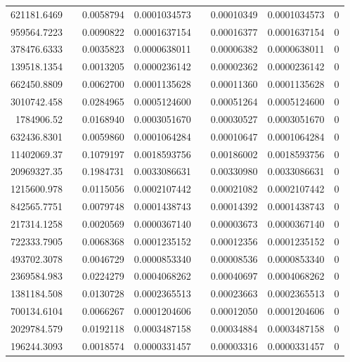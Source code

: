 \documentclass[
journal=jacsat, %
manuscript=article]{achemso}
\begin{document}
\begin{table}[htbp]
{\begin{tabular}{rrrrrrrr}
    621181.6469 &       & 0.0058794 & 0.0001034573 &       & 0.00010349 & 0.0001034573 & 0 \\
    959564.7223 &       & 0.0090822 & 0.0001637154 &       & 0.00016377 & 0.0001637154 & 0 \\
    378476.6333 &       & 0.0035823 & 0.0000638011 &       & 0.00006382 & 0.0000638011 & 0 \\
    139518.1354 &       & 0.0013205 & 0.0000236142 &       & 0.00002362 & 0.0000236142 & 0 \\
    662450.8809 &       & 0.0062700 & 0.0001135628 &       & 0.00011360 & 0.0001135628 & 0 \\
    3010742.458 &       & 0.0284965 & 0.0005124600 &       & 0.00051264 & 0.0005124600 & 0 \\
    1784906.52 &       & 0.0168940 & 0.0003051670 &       & 0.00030527 & 0.0003051670 & 0 \\
    632436.8301 &       & 0.0059860 & 0.0001064284 &       & 0.00010647 & 0.0001064284 & 0 \\
    11402069.37 &       & 0.1079197 & 0.0018593756 &       & 0.00186002 & 0.0018593756 & 0 \\
    20969327.35 &       & 0.1984731 & 0.0033086631 &       & 0.00330980 & 0.0033086631 & 0 \\
    1215600.978 &       & 0.0115056 & 0.0002107442 &       & 0.00021082 & 0.0002107442 & 0 \\
    842565.7751 &       & 0.0079748 & 0.0001438743 &       & 0.00014392 & 0.0001438743 & 0 \\
    217314.1258 &       & 0.0020569 & 0.0000367140 &       & 0.00003673 & 0.0000367140 & 0 \\
    722333.7905 &       & 0.0068368 & 0.0001235152 &       & 0.00012356 & 0.0001235152 & 0 \\
    493702.3078 &       & 0.0046729 & 0.0000853340 &       & 0.00008536 & 0.0000853340 & 0 \\
    2369584.983 &       & 0.0224279 & 0.0004068262 &       & 0.00040697 & 0.0004068262 & 0 \\
    1381184.508 &       & 0.0130728 & 0.0002365513 &       & 0.00023663 & 0.0002365513 & 0 \\
    700134.6104 &       & 0.0066267 & 0.0001204606 &       & 0.00012050 & 0.0001204606 & 0 \\
    2029784.579 &       & 0.0192118 & 0.0003487158 &       & 0.00034884 & 0.0003487158 & 0 \\
    196244.3093 &       & 0.0018574 & 0.0000331457 &       & 0.00003316 & 0.0000331457 & 0 \\

\end{tabular}}
\end{table}
\end{document}
